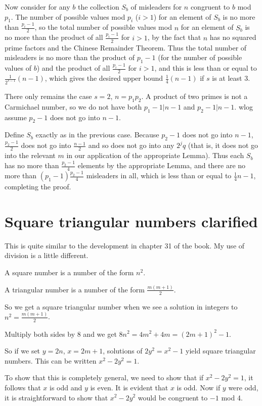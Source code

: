 \documentclass[12pt]{article}
\begin{document}
Now consider for any $b$ the collection $S_b$ of misleaders for $n$ congruent to $b$ mod $p_1$.
The number of possible values mod $p_i$ ($i>1$) for an element of $S_b$ is  no more than $\frac{p_i-1}2$, so the total number of possible values mod $n$ for an element of $S_b$ is no more than the product of all $\frac{p_i-1}2$ for $i>1$, by the fact that $n$ has no squared prime factors and the Chinese Remainder Theorem.
Thus the total number of misleaders is no more than the product of $p_1-1$ (for the number of possible
values of $b$) and the product of all $\frac{p_i-1}2$ for $i>1$, and this is less than or equal to
$\frac1{2^{s-1}}(n-1)$, which gives the desired upper bound $\frac 14(n-1)$ if $s$ is at least 3.

There only remains the case $s=2$, $n=p_1p_2$.  A product of two primes is not a Carmichael number, so we do not have both $p_1-1|n-1$ and $p_2-1|n-1$.  wlog assume $p_2-1$ does not go into $n-1$.

Define $S_b$ exactly as in the previous case.   Because $p_2-1$ does not go into $n-1$,
$\frac{p_2-1}2$ does not go into $\frac{n-1}2$ and so does not go into any $2^jq$ (that is, it does not go into the relevant $m$ in our application of the appropriate Lemma).  Thus each $S_b$ has no more than $\frac{p_2-1}4$ elements by the appropriate Lemma, and there are no more than $(p_1-1)\frac{p_2-1}4$ misleaders in all, which is  less than or equal to
$\frac14{n-1}$, completing the proof.

\section{Square triangular numbers clarified}

This is quite similar to the development in chapter 31 of the book.  My use of division is a little different.

A square number is a number of the form $n^2$.

A triangular number is a number of the form $\frac{m(m+1)}2$.

So we get a square triangular number when we see a solution in integers to $n^2=\frac{m(m+1)}2$.

Multiply both sides by 8 and we get $8n^2 = 4m^2+4m = (2m+1)^2-1$.

So if we set $y=2n$, $x=2m+1$, solutions of $2y^2= x^2-1$ yield square triangular numbers.  This can be written
$x^2-2y^2=1$.

To show that this is completely general, we need to show that if $x^2-2y^2=1$, it follows that $x$ is odd and $y$ is even.
It is evident that $x$ is odd.  Now if $y$ were odd, it is straightforward to show that $x^2-2y^2$ would be congruent to $-1$ mod 4.
\end{document}
